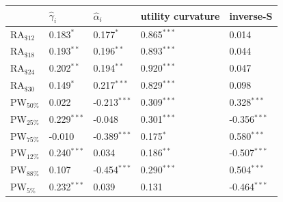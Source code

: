\begin{tabular}{lllll}
\hline
 & $\hat{\gamma}_i$ & $\hat{\alpha}_i$ & utility curvature & inverse-S \\
\hline
RA$_{\$12}$ & 0.183$^{*}$ & 0.177$^{*}$ & 0.865$^{***}$ & 0.014 \\
RA$_{\$18}$ & 0.193$^{**}$ & 0.196$^{**}$ & 0.893$^{***}$ & 0.044 \\
RA$_{\$24}$ & 0.202$^{**}$ & 0.194$^{**}$ & 0.920$^{***}$ & 0.047 \\
RA$_{\$30}$ & 0.149$^{*}$ & 0.217$^{***}$ & 0.829$^{***}$ & 0.098 \\
PW$_{50\%}$ & 0.022 & -0.213$^{***}$ & 0.309$^{***}$ & 0.328$^{***}$ \\
PW$_{25\%}$ & 0.229$^{***}$ & -0.048 & 0.301$^{***}$ & -0.356$^{***}$ \\
PW$_{75\%}$ & -0.010 & -0.389$^{***}$ & 0.175$^{*}$ & 0.580$^{***}$ \\
PW$_{12\%}$ & 0.240$^{***}$ & 0.034 & 0.186$^{**}$ & -0.507$^{***}$ \\
PW$_{88\%}$ & 0.107 & -0.454$^{***}$ & 0.290$^{***}$ & 0.504$^{***}$ \\
PW$_{5\%}$ & 0.232$^{***}$ & 0.039 & 0.131 & -0.464$^{***}$ \\
\hline
\end{tabular}
